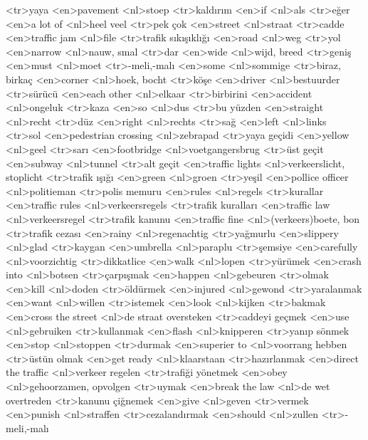 <tr>yaya
<en>pavement
<nl>stoep
<tr>kaldırım
<en>if
<nl>als
<tr>eğer
<en>a lot of
<nl>heel veel
<tr>pek çok
<en>street
<nl>straat
<tr>cadde
<en>traffic jam
<nl>file
<tr>trafik sıkışıklığı
<en>road
<nl>weg
<tr>yol
<en>narrow
<nl>nauw, smal
<tr>dar
<en>wide
<nl>wijd, breed
<tr>geniş
<en>must
<nl>moet
<tr>-meli,-malı
<en>some
<nl>sommige
<tr>biraz, birkaç
<en>corner
<nl>hoek, bocht
<tr>köşe
<en>driver
<nl>bestuurder
<tr>sürücü
<en>each other
<nl>elkaar
<tr>birbirini
<en>accident
<nl>ongeluk
<tr>kaza
<en>so
<nl>dus
<tr>bu yüzden
<en>straight
<nl>recht
<tr>düz
<en>right
<nl>rechts
<tr>sağ
<en>left
<nl>links
<tr>sol
<en>pedestrian crossing
<nl>zebrapad
<tr>yaya geçidi
<en>yellow
<nl>geel
<tr>sarı
<en>footbridge
<nl>voetgangersbrug
<tr>üst geçit
<en>subway
<nl>tunnel
<tr>alt geçit
<en>traffic lights
<nl>verkeerslicht, stoplicht
<tr>trafik ışığı
<en>green
<nl>groen
<tr>yeşil
<en>pollice officer
<nl>politieman
<tr>polis memuru
<en>rules
<nl>regels
<tr>kurallar
<en>traffic rules
<nl>verkeersregels
<tr>trafik kuralları
<en>traffic law
<nl>verkeersregel
<tr>trafik kanunu
<en>traffic fine
<nl>(verkeers)boete, bon
<tr>trafik cezası
<en>rainy
<nl>regenachtig
<tr>yağmurlu
<en>slippery
<nl>glad
<tr>kaygan
<en>umbrella
<nl>paraplu
<tr>şemsiye
<en>carefully
<nl>voorzichtig
<tr>dikkatlice
<en>walk
<nl>lopen
<tr>yürümek
<en>crash into
<nl>botsen
<tr>çarpışmak
<en>happen
<nl>gebeuren
<tr>olmak
<en>kill
<nl>doden
<tr>öldürmek
<en>injured
<nl>gewond
<tr>yaralanmak
<en>want
<nl>willen
<tr>istemek
<en>look
<nl>kijken
<tr>bakmak
<en>cross the street
<nl>de straat oversteken
<tr>caddeyi geçmek
<en>use
<nl>gebruiken
<tr>kullanmak
<en>flash
<nl>knipperen
<tr>yanıp sönmek
<en>stop
<nl>stoppen
<tr>durmak
<en>superier to
<nl>voorrang hebben
<tr>üstün olmak
<en>get ready
<nl>klaarstaan
<tr>hazırlanmak
<en>direct the traffic
<nl>verkeer regelen
<tr>trafiği yönetmek
<en>obey
<nl>gehoorzamen, opvolgen
<tr>uymak
<en>break the law
<nl>de wet overtreden
<tr>kanunu çiğnemek
<en>give
<nl>geven
<tr>vermek
<en>punish
<nl>straffen
<tr>cezalandırmak
<en>should
<nl>zullen
<tr>-meli,-malı

